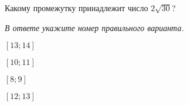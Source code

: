 \begin{ex}
	\begin{condition}
		Какому промежутку принадлежит число $2\sqrt{30}$?
		
		\textit{В ответе укажите номер правильного варианта.}
		\begin{enumcols}[columns=4]
				\item $[13;14]$
				\item $[10;11]$
				\item $[8;9]$
				\item $[12;13]$
		\end{enumcols}
	\end{condition}
\end{ex}